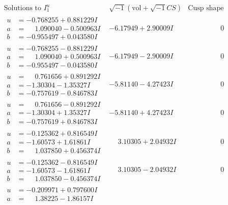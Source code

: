 \documentclass[1p]{elsarticle_modified}
\theoremstyle{definition}
\newcommand{\I}{\sqrt{-1}}
\begin{document}
$$\begin{array}{c|c|c}
\text{Solutions to }I^u_{1}& \I (\text{vol} + \sqrt{-1}CS) & \text{Cusp shape}\\
 \hline 
\begin{aligned}
u &= -0.768255 + 0.881229 I \\
a &= \phantom{-}1.090040 - 0.500963 I \\
b &= -0.955497 + 0.043580 I\end{aligned}
 & -6.17949 + 2.90009 I & \phantom{-0.000000 } 0 \\ \hline\begin{aligned}
u &= -0.768255 - 0.881229 I \\
a &= \phantom{-}1.090040 + 0.500963 I \\
b &= -0.955497 - 0.043580 I\end{aligned}
 & -6.17949 - 2.90009 I & \phantom{-0.000000 } 0 \\ \hline\begin{aligned}
u &= \phantom{-}0.761656 + 0.891292 I \\
a &= -1.30304 - 1.35327 I \\
b &= -0.757619 - 0.846783 I\end{aligned}
 & -5.81140 - 4.27423 I & \phantom{-0.000000 } 0 \\ \hline\begin{aligned}
u &= \phantom{-}0.761656 - 0.891292 I \\
a &= -1.30304 + 1.35327 I \\
b &= -0.757619 + 0.846783 I\end{aligned}
 & -5.81140 + 4.27423 I & \phantom{-0.000000 } 0 \\ \hline\begin{aligned}
u &= -0.125362 + 0.816549 I \\
a &= -1.60573 + 1.61861 I \\
b &= \phantom{-}1.037850 + 0.456374 I\end{aligned}
 & \phantom{-}3.10305 + 2.04932 I & \phantom{-0.000000 } 0 \\ \hline\begin{aligned}
u &= -0.125362 - 0.816549 I \\
a &= -1.60573 - 1.61861 I \\
b &= \phantom{-}1.037850 - 0.456374 I\end{aligned}
 & \phantom{-}3.10305 - 2.04932 I & \phantom{-0.000000 } 0 \\ \hline\begin{aligned}
u &= -0.209971 + 0.797600 I \\
a &= \phantom{-}1.38225 - 1.86157 I \\

\end{aligned}
\end{array}$$
\end{document}

